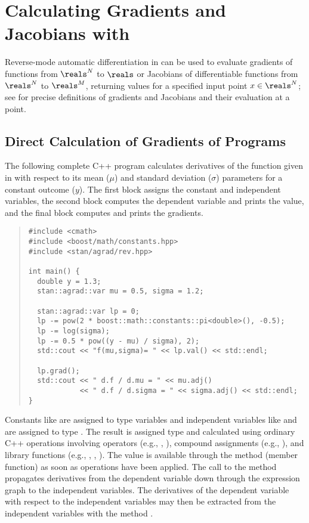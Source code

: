 \documentclass[10pt]{article}
\begin{document}
\section{Calculating Gradients and Jacobians with }\label{calc-gradients.section}

Reverse-mode automatic differentiation in  can be
used to evaluate gradients of functions from $\reals^N$ to $\reals$ or
Jacobians of differentiable functions from $\reals^N$ to $\reals^M$,
returning values for a specified input point $x \in \reals^N$; see
 for precise definitions of
gradients and Jacobians and their evaluation at a point.

\subsection{Direct Calculation of Gradients of Programs}

The following complete C++ program calculates derivatives of the
function given in  with respect to its mean
($\mu$) and standard deviation ($\sigma$) parameters for a constant
outcome ($y$).  The first block assigns the constant and independent
variables, the second block computes the dependent variable and prints
the value, and the final block computes and prints the gradients.
%
\begin{quote}
\begin{Verbatim}
#include <cmath>
#include <boost/math/constants.hpp>
#include <stan/agrad/rev.hpp>

int main() { 
  double y = 1.3;
  stan::agrad::var mu = 0.5, sigma = 1.2;

  stan::agrad::var lp = 0;
  lp -= pow(2 * boost::math::constants::pi<double>(), -0.5);
  lp -= log(sigma);
  lp -= 0.5 * pow((y - mu) / sigma), 2);
  std::cout << "f(mu,sigma)= " << lp.val() << std::endl;

  lp.grad();
  std::cout << " d.f / d.mu = " << mu.adj()
            << " d.f / d.sigma = " << sigma.adj() << std::endl;
}
\end{Verbatim}
\end{quote}
%
Constants like  are assigned to type  variables
and independent variables like  and  are assigned
to type .  The result  is assigned type 
and calculated using ordinary C++ operations involving operators
(e.g., \code{*}, \code{/}), compound assignments (e.g., \code{-=}),
and library functions (e.g., , , ).  The
value is available through the method (member function)  as soon as
operations have been applied.  The call to the method
 propagates derivatives from the dependent variable
 down through the expression graph to the independent
variables.  The derivatives of the dependent variable with respect to
the independent variables may then be extracted from the independent
variables with the method .
\end{document}
